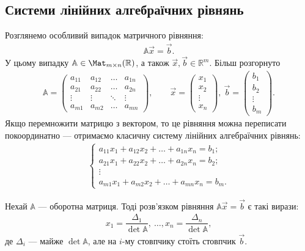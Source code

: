 \documentclass{math_library}
\begin{document}
\subsection{Системи лінійних алгебраїчних рівнянь}
Розглянемо особливий випадок матричного рівняння:
\begin{align*}
\mathbb{A} \vec{x} = \vec{b}.
\end{align*}
У цьому випадку $\mathbb{A} \in \Mat_{m \times n}(\mathbb{R})$, а також $\vec{x},\vec{b} \in \mathbb{R}^m$. Більш розгорнуто
\begin{align*}
\mathbb{A} = \begin{pmatrix}
a_{11} & a_{12} & \dots & a_{1n} \\
a_{21} & a_{22} & \dots & a_{2n} \\
\vdots & \vdots & \ddots & \vdots \\
a_{m1} & a_{m2} & \dots & a_{mn}
\end{pmatrix}, \qquad  \vec{x} = \begin{pmatrix}
x_1 \\ x_2 \\ \vdots \\ x_n
\end{pmatrix},\ \vec{b} = \begin{pmatrix}
b_1 \\ b_2 \\ \vdots \\ b_m
\end{pmatrix}.
\end{align*}
Якщо перемножити матрицю з вектором, то це рівняння можна переписати покоординатно --- отримаємо класичну систему лінійних алгебраїчних рівнянь:
\begin{align*}
\begin{cases}
a_{11}x_1 + a_{12}x_2 + \dots + a_{1n}x_n = b_1; \\
a_{21}x_1 + a_{22}x_2 + \dots + a_{2n}x_n = b_2; \\
\vdots \\
a_{m1}x_1 + a_{m2}x_2 + \dots + a_{mn}x_n = b_m.
\end{cases}
\end{align*}

\begin{theorem}
Нехай $\mathbb{A}$ --- оборотна матриця. Тоді розв'язком рівняння $\mathbb{A} \vec{x} = \vec{b}$ є такі вирази:
\begin{align*}
x_1 = \dfrac{\Delta_1}{\det \mathbb{A}},\ \dots, x_n = \dfrac{\Delta_n}{\det \mathbb{A}},
\end{align*}
де $\Delta_i$ --- майже $\det \mathbb{A}$, але на $i$-му стовпчику стоїть стовпчик $\vec{b}$.
\end{theorem}
\end{document}
